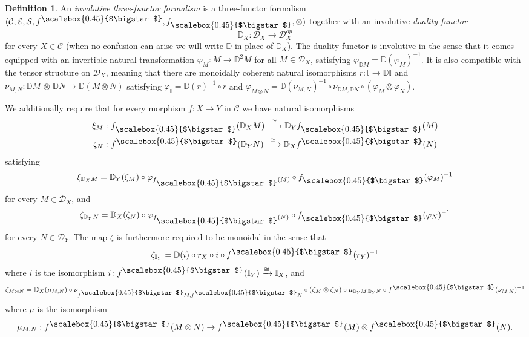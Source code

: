 \documentclass[10pt,a4paper,oneside]{amsart}
\theoremstyle{remark}
\theoremstyle{definition}
\newtheorem{definition}[theorem]{Definition}
\newcommand{\rar}{\rightarrow}
\newcommand{\smsq}{{\mathbin{\vcenter{\hbox{\scalebox{0.45}{$\bigstar$}}}}}}
\newcommand{\pull}[1]{#1^\smsq}
\newcommand{\push}[1]{#1_\smsq}
\begin{document}
\begin{definition}\label{def:inv3ff}
    An \emph{involutive three-functor formalism} is a three-functor formalism $(\mathcal{C},\mathcal{E},\mathcal{S}, \pull{f}, \push{f}, \otimes)$ together with an involutive \emph{duality functor}
\[
\mathbb D_X\colon \mathcal{D}_X \longrightarrow\mathcal{D}_X^{op}
\]
    for every $X\in \mathcal{C}$ (when no confusion can arise we will write $\mathbb{D}$ in place of $\mathbb{D}_X$).
The duality functor is involutive in the sense that it comes equipped with an invertible natural transformation $\varphi_M:M \to \mathbb D^2 M$ for all $M\in\mathcal D_X$, satisfying $ \varphi_{\mathbb D M}=\mathbb D(\varphi_M)^{-1}$.
It is also compatible with the tensor structure on $\mathcal D_X$, meaning that there are monoidally coherent natural isomorphisms $r:\mathbb I\to \mathbb D \mathbb I$ and $\nu_{M,N}:\mathbb DM\,\otimes\, \mathbb DN \to \mathbb D(M\otimes N)$ satisfying $\varphi_{\mathbb I}=\mathbb D(r)^{-1} \circ r$
and $\varphi_{M\otimes N} =
\mathbb D(\nu_{M,N})^{-1}
\circ
\nu_{\mathbb DM,\mathbb DN}
\circ (\varphi_M\otimes \varphi_N)$.

We additionally require that for every morphism $f\colon X \rar Y$ in $\mathcal{C}$ we have natural isomorphisms
\begin{equation}
\label{eq: map xi}
\begin{split}
\xi_M \,&\colon \push{f}(\mathbb{D}_XM) \xrightarrow{\,\,\cong\,\,} \mathbb{D}_Y\push{f}(M)
\\
\zeta_N \,&\colon \pull{f}(\mathbb{D}_YN) \xrightarrow{\,\,\cong\,\,} \mathbb{D}_X\pull{f}(N)
\end{split}
\end{equation}
satisfying
$$\xi_{\mathbb{D}_XM}=\mathbb{D}_Y(\xi_{M})\circ \varphi_{\push{f}(M)}\circ 
\push{f}(\varphi_{M})^{-1}
$$ for every $M\in \mathcal{D}_X$, and 
$$\zeta_{\mathbb{D}_YN}=\mathbb{D}_X(\zeta_{N})\circ \varphi_{\push{f}(N)}\circ 
\push{f}(\varphi_{N})^{-1}
$$
for every $N\in \mathcal{D}_Y$.
The map $\zeta$ is furthermore required to be monoidal in the sense that %
$$\zeta_{{\mathbb I}_Y}= \mathbb D(i)\circ r_X \circ i \circ \pull{f}(r_Y)^{-1}$$ where $i$ is the isomorphism $i \colon \pull{f}(\mathbb{I}_Y)\xrightarrow{\cong} {\mathbb I}_X$, and $$\zeta_{M \otimes N}= \mathbb{D}_X(\mu_{M,N })\circ \nu_{\pull{f}M,\pull{f}N}\circ (\zeta_M \otimes \zeta_N)\circ\mu_{\mathbb{D}_YM,\mathbb{D}_YN}\circ\pull{f}(\nu_{M,N})^{-1}$$
where $\mu$ is the isomorphism $$\mu_{M,N}:\pull{f}(M\otimes N) \to \pull{f}(M)\otimes \pull{f}(N).$$





\end{definition}
\end{document}
